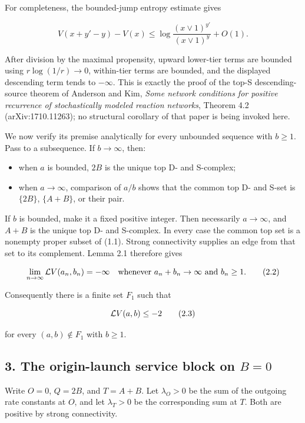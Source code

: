 For completeness, the bounded-jump entropy estimate gives

\[
 V(x+y'-y)-V(x)
 \le\log\frac{(x\vee1)^{y'}}{(x\vee1)^y}+O(1).                \tag{2.1}
\]

After division by the maximal propensity, upward lower-tier terms are
bounded using \(r\log(1/r)\to0\), within-tier terms are bounded, and the
displayed descending term tends to \(-\infty\). This is exactly the
proof of the top-S descending-source theorem of Anderson and Kim,
\emph{Some network conditions for positive recurrence of stochastically
modeled reaction networks}, Theorem 4.2 (arXiv:1710.11263); no
structural corollary of that paper is being invoked here.

We now verify its premise analytically for every unbounded sequence with
\(b\ge1\). Pass to a subsequence. If \(b\to\infty\), then:

\begin{itemize}
\tightlist
\item
  when \(a\) is bounded, \(2B\) is the unique top D- and S-complex;
\item
  when \(a\to\infty\), comparison of \(a/b\) shows that the common top
  D- and S-set is \(\{2B\}\), \(\{A+B\}\), or their pair.
\end{itemize}

If \(b\) is bounded, make it a fixed positive integer. Then necessarily
\(a\to\infty\), and \(A+B\) is the unique top D- and S-complex. In every
case the common top set is a nonempty proper subset of (1.1). Strong
connectivity supplies an edge from that set to its complement. Lemma 2.1
therefore gives

\[
 \lim_{n\to\infty}{\cal L}V(a_n,b_n)=-\infty
 \quad\text{whenever }a_n+b_n\to\infty\text{ and }b_n\ge1.    \tag{2.2}
\]

Consequently there is a finite set \(F_1\) such that

\[
                       {\cal L}V(a,b)\le-2                     \tag{2.3}
\]

for every \((a,b)\notin F_1\) with \(b\ge1\).

\subsection{\texorpdfstring{3. The origin-launch service block on
\(B=0\)}{3. The origin-launch service block on B=0}}

Write \(O=0\), \(Q=2B\), and \(T=A+B\). Let \(\lambda_O>0\) be the sum
of the outgoing rate constants at \(O\), and let \(\lambda_T>0\) be the
corresponding sum at \(T\). Both are positive by strong connectivity.

